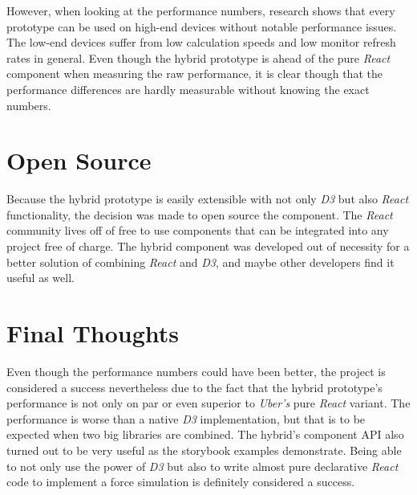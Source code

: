 However, when looking at the performance numbers, research shows that every prototype can be used on high-end devices without notable performance issues. The low-end devices suffer from low calculation speeds and low monitor refresh rates in general. Even though the hybrid prototype is ahead of the pure \emph{React} component when measuring the raw performance, it is clear though that the performance differences are hardly measurable without knowing the exact numbers.

\section{Open Source}

Because the hybrid prototype is easily extensible with not only \emph{D3} but also \emph{React} functionality, the decision was made to open source the component. The \emph{React} community lives off of free to use components that can be integrated into any project free of charge. The hybrid component was developed out of necessity for a better solution of combining \emph{React} and \emph{D3}, and maybe other developers find it useful as well.

\section{Final Thoughts}

Even though the performance numbers could have been better, the project is considered a success nevertheless due to the fact that the hybrid prototype's performance is not only on par or even superior to \emph{Uber's} pure \emph{React} variant. The performance is worse than a native \emph{D3} implementation, but that is to be expected when two big libraries are combined. The hybrid's component API also turned out to be very useful as the storybook examples demonstrate. Being able to not only use the power of \emph{D3} but also to write almost pure declarative \emph{React} code to implement a force simulation is definitely considered a success.







